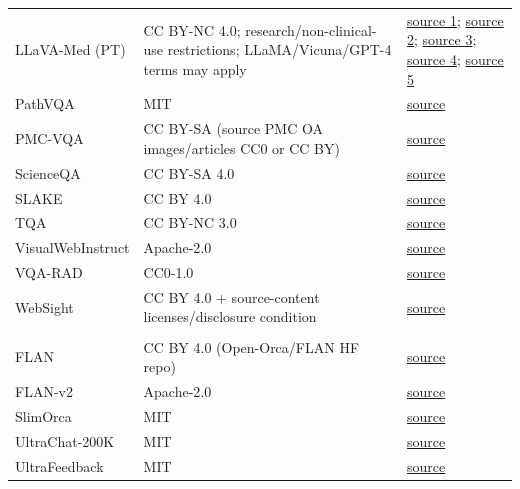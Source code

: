 \begin{longtable}{@{}>{\raggedright\arraybackslash}p{}>{\raggedright\arraybackslash}p{}>{\raggedright\arraybackslash}p{}@{}}
LLaVA-Med (PT) & CC BY-NC 4.0; research/non-clinical-use restrictions; LLaMA/Vicuna/GPT-4 terms may apply & \href{https://huggingface.co/datasets/Shubhangi29/llava_med_alignment_500k_chunk_1}{source 1}; \href{https://huggingface.co/datasets/Shubhangi29/llava_med_alignment_500k_chunk_2}{source 2}; \href{https://huggingface.co/datasets/Shubhangi29/llava_med_alignment_500k_chunk_3}{source 3}; \href{https://huggingface.co/datasets/Shubhangi29/llava_med_alignment_500k_chunk_4}{source 4}; \href{https://huggingface.co/datasets/Shubhangi29/llava_med_alignment_500k_chunk_5}{source 5} \\
PathVQA & MIT & \href{https://huggingface.co/datasets/flaviagiammarino/path-vqa}{source} \\
PMC-VQA & CC BY-SA (source PMC OA images/articles CC0 or CC BY) & \href{https://huggingface.co/datasets/xmcmic/PMC-VQA}{source} \\
ScienceQA & CC BY-SA 4.0 & \href{https://huggingface.co/datasets/derek-thomas/ScienceQA}{source} \\
SLAKE & CC BY 4.0 & \href{https://huggingface.co/datasets/BoKelvin/SLAKE}{source} \\
TQA & CC BY-NC 3.0 & \href{https://s3.amazonaws.com/ai2-vision-textbook-dataset/dataset_releases/tqa/tqa_train_val_test.zip}{source} \\
VisualWebInstruct & Apache-2.0 & \href{https://huggingface.co/datasets/TIGER-Lab/VisualWebInstruct}{source} \\
VQA-RAD & CC0-1.0 & \href{https://huggingface.co/datasets/flaviagiammarino/vqa-rad}{source} \\
WebSight & CC BY 4.0 + source-content licenses/disclosure condition & \href{https://huggingface.co/datasets/HuggingFaceM4/WebSight}{source} \\
\midrule
\rowcolor{textcolor}\multicolumn{3}{l}{\textit{Text}} \\
FLAN & CC BY 4.0 (Open-Orca/FLAN HF repo) & \href{https://huggingface.co/datasets/Open-Orca/FLAN}{source} \\
FLAN-v2 & Apache-2.0 & \href{https://huggingface.co/datasets/SirNeural/flan_v2}{source} \\
SlimOrca & MIT & \href{https://huggingface.co/datasets/Open-Orca/SlimOrca}{source} \\
UltraChat-200K & MIT & \href{https://huggingface.co/datasets/HuggingFaceH4/ultrachat_200k}{source} \\
UltraFeedback & MIT & \href{https://huggingface.co/datasets/openbmb/UltraFeedback}{source} \\

\end{longtable}

